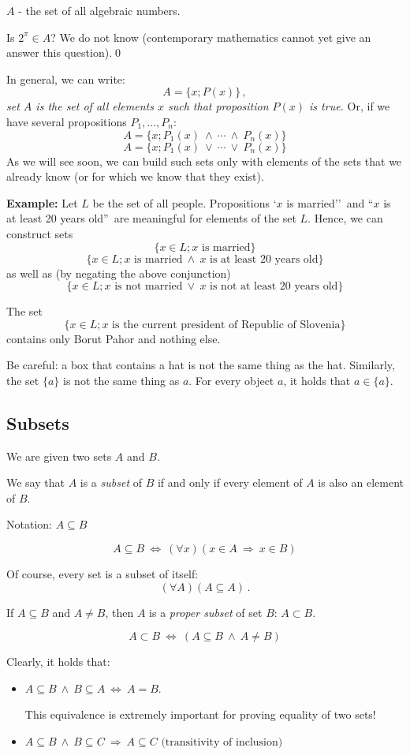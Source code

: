 \documentclass[11pt,paper=b5,footinclude,headinclude]{scrbook} %
\def\ali {{~\vee~}}
\def\inn {{~\wedge~}}
\def\sledi {{~\Rightarrow~}}
\def\cee {{~\Leftrightarrow~}}
\theoremstyle{remark}
\theoremstyle{definition} %
\begin{document}
\medskip
$A$ - the set of all algebraic numbers.

Is $2^{\pi}\in A$? We do not know (contemporary mathematics cannot yet give an answer this question).\qed

\medskip
In general, we can write:
$$A = \{x; P(x)\}\,,$$
{\em set $A$ is the set of all elements $x$ such that proposition $P(x)$ is true.}
Or, if we have several propositions $P_1,\ldots, P_n$:
$$A = \{x; P_1(x)\inn \cdots\inn P_n(x)\}$$
$$A = \{x; P_1(x)\ali \cdots\ali P_n(x)\}$$
As we will see soon, we can build such sets only with elements of the sets that we already know (or for which we know that they exist).

\medskip
\textbf{ Example:}
Let  $L$ be the set of all people. Propositions `$x$ is married''~and ``$x$ is at least 20 years old''~are meaningful for elements of the set $L$.
Hence, we can construct sets
      $$\{x\in L; x \textrm{ is married}\}$$
      $$\{x\in L; x \textrm{ is married} \inn x \textrm{ is at least 20 years old}\}$$
as well as (by negating the above conjunction)
      $$\{x\in L; x \textrm{ is not married} \ali x \textrm{ is not at least 20 years old}\}$$

The set
      $$\{x\in L; x \textrm{ is the current president of Republic of Slovenia}\}$$
contains only Borut Pahor and nothing else.

\medskip
Be careful: a box that contains a hat is not the same thing as the hat.
Similarly, the set
$\{a\}$ is not the same thing as $a$. For every object $a$, it holds that $a\in \{a\}$.

\subsection{Subsets}
We are given two sets $A$ and $B$.

We say that $A$ is a {\em subset} of $B$ if and only if every element of $A$ is also an element of  $B$.

Notation: $A\subseteq B$

$$A\subseteq B\cee (\forall x)(x\in A\sledi x\in B)$$

Of course, every set is a subset of itself: $$(\forall A)(A\subseteq A)\,.$$

If $A\subseteq B$ and $A\neq B$, then $A$ is a  {\em proper subset } of set $B$: $A\subset B$.

$$A\subset B\cee (A\subseteq B \inn A\neq B)$$

Clearly, it holds that:
\begin{itemize}
  \item $A\subseteq B \inn B\subseteq A \cee A = B$.

  This equivalence is extremely important for proving equality of two sets!
  \item $A\subseteq B \inn B\subseteq C \sledi A \subseteq C \textrm{~(transitivity of inclusion)}$
\end{itemize}
\end{document}
